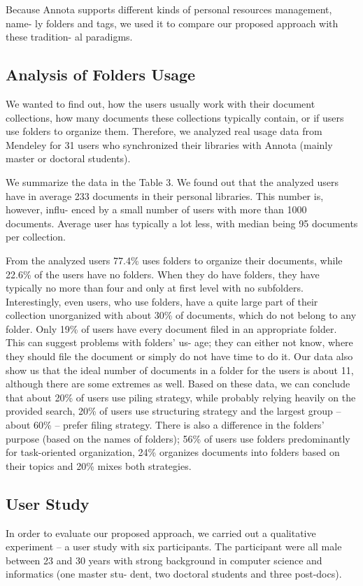 \documentclass{llncs}
\begin{document}
Because Annota supports different kinds of personal resources management, name- ly folders and tags, we used it to compare our proposed approach with these tradition- al paradigms.

\subsection{Analysis of Folders Usage}

We wanted to find out, how the users usually work with their document collections, how many documents these collections typically contain, or if users use folders to organize them. Therefore, we analyzed real usage data from Mendeley for 31 users who synchronized their libraries with Annota (mainly master or doctoral students).

We summarize the data in the Table 3. We found out that the analyzed users have in average 233 documents in their personal libraries. This number is, however, influ- enced by a small number of users with more than 1000 documents. Average user has typically a lot less, with median being 95 documents per collection.

From the analyzed users 77.4\% uses folders to organize their documents, while 22.6\% of the users have no folders. When they do have folders, they have typically no more than four and only at first level with no subfolders. Interestingly, even users, who use folders, have a quite large part of their collection unorganized with about 30\% of documents, which do not belong to any folder. Only 19\% of users have every document filed in an appropriate folder. This can suggest problems with folders’ us- age; they can either not know, where they should file the document or simply do not have time to do it. Our data also show us that the ideal number of documents in a folder for the users is about 11, although there are some extremes as well.
Based on these data, we can conclude that about 20\% of users use piling strategy, while probably relying heavily on the provided search, 20\% of users use structuring strategy and the largest group – about 60\% – prefer filing strategy. There is also a difference in the folders’ purpose (based on the names of folders); 56\% of users use folders predominantly for task-oriented organization, 24\% organizes documents into folders based on their topics and 20\% mixes both strategies.

\subsection{User Study}
In order to evaluate our proposed approach, we carried out a qualitative experiment – a user study with six participants. The participant were all male between 23 and 30 years with strong background in computer science and informatics (one master stu- dent, two doctoral students and three post-docs).
\end{document}
